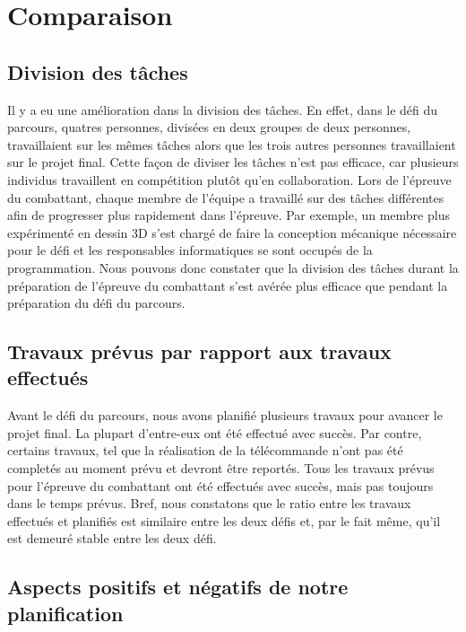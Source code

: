 \section{Comparaison}

\subsection{Division des tâches}

\begin{spacing}{1.5}
    Il y a eu une amélioration dans la division des tâches.
    En effet, dans le défi du parcours, quatres personnes, divisées en deux groupes de deux personnes, travaillaient sur les mêmes tâches alors que les trois autres personnes travaillaient sur le projet final.
    Cette façon de diviser les tâches n'est pas efficace, car plusieurs individus travaillent en compétition plutôt qu'en collaboration.
    Lors de l'épreuve du combattant, chaque membre de l'équipe a travaillé sur des tâches différentes afin de progresser plus rapidement dans l'épreuve.
    Par exemple, un membre plus expérimenté en dessin 3D s'est chargé de faire la conception mécanique nécessaire pour le défi et les responsables informatiques se sont occupés de la programmation.
    Nous pouvons donc constater que la division des tâches durant la préparation de l'épreuve du combattant s'est avérée plus efficace que pendant la préparation du défi du parcours.
\end{spacing}

\subsection{Travaux prévus par rapport aux travaux effectués}

\begin{spacing}{1.5}
    Avant le défi du parcours, nous avons planifié plusieurs travaux pour avancer le projet final.
    La plupart d'entre-eux ont été effectué avec succès.
    Par contre, certains travaux, tel que la réalisation de la télécommande n'ont pas été completés au moment prévu et devront être reportés.
    Tous les travaux prévus pour l'épreuve du combattant ont été effectués avec succès, mais pas toujours dans le temps prévus.
    Bref, nous constatons que le ratio entre les travaux effectués et planifiés est similaire entre les deux défis et, par le fait même, qu'il est demeuré stable entre les deux défi.
\end{spacing}

\subsection{Aspects positifs et négatifs de notre planification}

